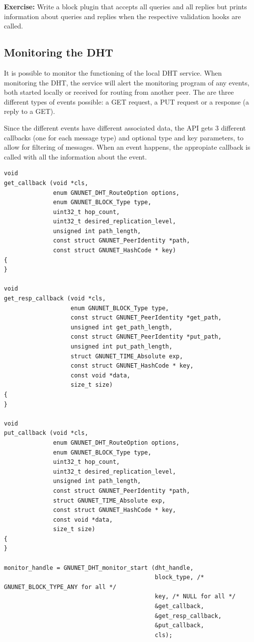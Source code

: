 \documentclass[10pt]{article}
\newcommand{\exercise}[1]{\noindent\begin{boxedminipage}{\textwidth}{\bf Exercise:} #1 \end{boxedminipage}}
\begin{document}
\exercise{Write a block plugin that accepts all queries
and all replies but prints information about queries and replies
when the respective validation hooks are called.}



\subsection{Monitoring the DHT}
It is possible to monitor the functioning of the local DHT service. When monitoring
the DHT, the service will alert the monitoring program of any events,
both started locally or received for routing from another peer. The are three different
types of events possible: a GET request, a PUT request or a response (a reply to
a GET).

Since the different events have different associated data, the API gets 3
different callbacks (one for each message type) and optional type and key parameters,
to allow for filtering of messages. When an event happens, the appropiate callback
is called with all the information about the event.
\lstset{language=C}
\begin{lstlisting}
void
get_callback (void *cls,
              enum GNUNET_DHT_RouteOption options,
              enum GNUNET_BLOCK_Type type,
              uint32_t hop_count,
              uint32_t desired_replication_level,
              unsigned int path_length,
              const struct GNUNET_PeerIdentity *path,
              const struct GNUNET_HashCode * key)
{
}

void
get_resp_callback (void *cls,
                   enum GNUNET_BLOCK_Type type,
                   const struct GNUNET_PeerIdentity *get_path,
                   unsigned int get_path_length,
                   const struct GNUNET_PeerIdentity *put_path,
                   unsigned int put_path_length,
                   struct GNUNET_TIME_Absolute exp,
                   const struct GNUNET_HashCode * key,
                   const void *data,
                   size_t size)
{
}

void
put_callback (void *cls,
              enum GNUNET_DHT_RouteOption options,
              enum GNUNET_BLOCK_Type type,
              uint32_t hop_count,
              uint32_t desired_replication_level,
              unsigned int path_length,
              const struct GNUNET_PeerIdentity *path,
              struct GNUNET_TIME_Absolute exp,
              const struct GNUNET_HashCode * key,
              const void *data,
              size_t size)
{
}

monitor_handle = GNUNET_DHT_monitor_start (dht_handle,
                                           block_type, /* GNUNET_BLOCK_TYPE_ANY for all */
                                           key, /* NULL for all */
                                           &get_callback,
                                           &get_resp_callback,
                                           &put_callback,
                                           cls);
\end{lstlisting}
\end{document}
